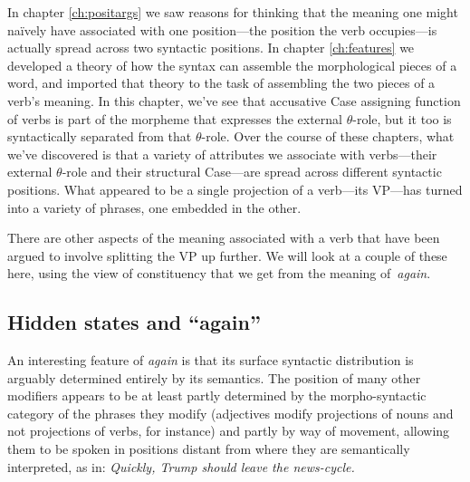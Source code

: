 In chapter \ref{ch:positargs} we saw reasons for thinking that the meaning one might na\"ively have associated with one position---the position the verb occupies---is actually spread across two syntactic positions. In chapter \ref{ch:features} we developed a theory of how the syntax can assemble the morphological pieces of a word, and imported that theory to the task of assembling the two pieces of a verb's meaning. In this chapter, we've see that accusative Case assigning function of verbs is part of the morpheme that expresses the external $\theta$-role, but it too is syntactically separated from that $\theta$-role. Over the course of these chapters, what we've discovered is that a variety of attributes we associate with verbs---their external $\theta$-role and their structural Case---are spread across different syntactic positions. What appeared to be a single projection of a verb---its VP---has turned into a variety of phrases, one embedded in the other. 

There are other aspects of the meaning associated with a verb that have been argued to involve splitting the VP up further. We will look at a couple of these here, using the view of constituency that we get from the meaning of~\emph{again}.

\subsection{Hidden states and ``again''} 
\label{sub:again}

An interesting feature of \emph{again} is that its surface syntactic distribution is arguably determined entirely by its semantics. The position of many other modifiers appears to be at least partly determined by the morpho-syntactic category of the phrases they modify (adjectives modify projections of nouns and not projections of verbs, for instance) and partly by way of movement, allowing them to be spoken in positions distant from where they are semantically interpreted, as in: \emph{Quickly, Trump should leave the news-cycle.}

